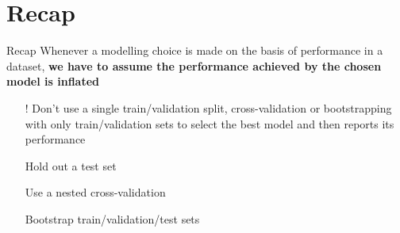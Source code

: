 \section{Recap}

\begin{frame}{Recap}
    Whenever a modelling choice is made on the basis of
    performance in a dataset, \textbf{we have to assume the
    performance achieved by the chosen model is inflated}
    \begin{itemize}
        \item[!] Don't use a single train/validation split, cross-validation or bootstrapping with only train/validation sets to select the best model and then reports its performance
        \item[\textrightarrow] Hold out a test set
        \item[\textrightarrow] Use a nested cross-validation
        \item[\textrightarrow] Bootstrap train/validation/test sets
    \end{itemize}
\end{frame}
